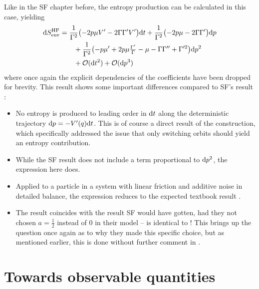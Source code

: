 Like in the SF chapter before, the entropy production  can be calculated in this case, yielding 
%
\begin{equation}\begin{split}
	\label{eqn:hf entropy}
	\mathrm{d}S_\text{env}^{\text{HF}} &=
	\frac1{\Gamma^2}\bigl(-2p\mu V'-2\Gamma\Gamma'V'\bigr)\mathrm{d} t
	+ \frac1{\Gamma^2}\bigl(-2p\mu-2\Gamma\Gamma'\bigr)\mathrm{d} p
	\\&\qquad
	+ \frac1{\Gamma^2}\bigl( -p\mu' + 2p\mu \tfrac{\Gamma'}\Gamma - \mu - \Gamma\Gamma'' + \Gamma'^2 \bigr) \mathrm{d} p^2
	\\&\qquad
	+ \mathcal{O}(\mathrm{d} t^2) + \mathcal{O}(\mathrm{d} p^3)
\end{split}\end{equation}
%
where once again the explicit dependencies of the coefficients have been dropped for brevity. This result shows some important differences compared to SF's result :
%
\begin{itemize}
	\item No entropy is produced to leading order in \(\mathrm{d} t\) along the deterministic trajectory \(\mathrm{d} p = -V'(q)\mathrm{d} t\). This is of course a direct result of the construction, which specifically addressed the issue that only switching orbits should yield an entropy contribution.
	\item While the SF result does not include a term proportional to \(\mathrm{d} p^2\), the expression here does.
	\item Applied to a particle in a system with linear friction and additive noise in detailed balance, the expression reduces to the expected textbook result .
	\item The result coincides with the result SF would have gotten, had they not chosen \(a = \tfrac12\) instead of \(0\) in their model --  is identical to ! This brings up the question once again as to why they made this specific choice, but as mentioned earlier, this is done without further comment in \cite{sf}.
\end{itemize}






\section{Towards observable quantities}

